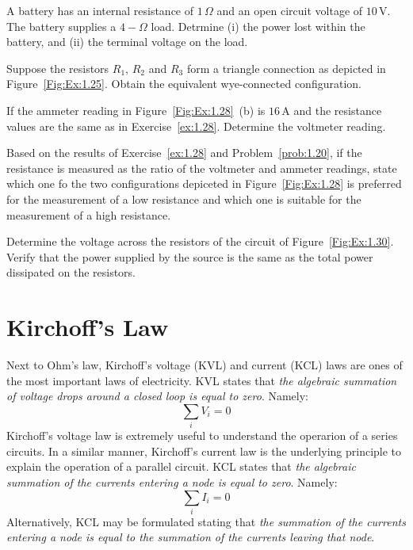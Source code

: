 \begin{problem}
A battery has an internal resistance of $1\,\Omega$ and an open circuit voltage of $10\,\textrm{V}$. The battery supplies a $4-\Omega$ load. Detrmine (i) the power lost within the battery, and (ii) the terminal voltage on the load.
\end{problem}

\begin{problem}
Suppose the resistors $R_1$, $R_2$ and $R_3$ form a triangle connection as depicted in Figure~\ref{Fig:Ex:1.25}. Obtain the equivalent wye-connected configuration.
\end{problem}

\begin{problem}
\label{prob:1.20}
If the ammeter reading in Figure~\ref{Fig:Ex:1.28}~(b) is $16\,\textrm{A}$ and the resistance values are the same as in Exercise~\ref{ex:1.28}. Determine the voltmeter reading.
\end{problem}

\begin{problem}
Based on the results of Exercise~\ref{ex:1.28} and Problem~\ref{prob:1.20}, if the resistance is measured as the ratio of the voltmeter and ammeter readings, state which one fo the two configurations depiceted in Figure~\ref{Fig:Ex:1.28} is preferred for the measurement of a low resistance and which one is suitable for the measurement of a high resistance.
\end{problem}

\begin{problem}
Determine the voltage across the resistors of the circuit of Figure~\ref{Fig:Ex:1.30}. Verify that the power supplied by the source is the same as the total power dissipated on the resistors.
\end{problem}

\section{Kirchoff's Law}
Next to Ohm's law, Kirchoff's voltage (KVL) and current (KCL) laws are ones of the most important laws of electricity. KVL states that \emph{the algebraic summation of voltage drops around a closed loop is equal to zero}. Namely:
\begin{equation}
\sum_iV_i = 0
\end{equation}
Kirchoff's voltage law is extremely useful to understand the operarion of a series circuits. In a similar manner, Kirchoff's current law is the underlying principle to explain the operation of a parallel circuit. KCL states that \emph{the algebraic summation of the currents entering a node is equal to zero}. Namely:
\begin{equation}
\sum_iI_i = 0
\end{equation}
Alternatively, KCL may be formulated stating that \emph{the summation of the currents entering a node is equal to the summation of the currents leaving that node}.

